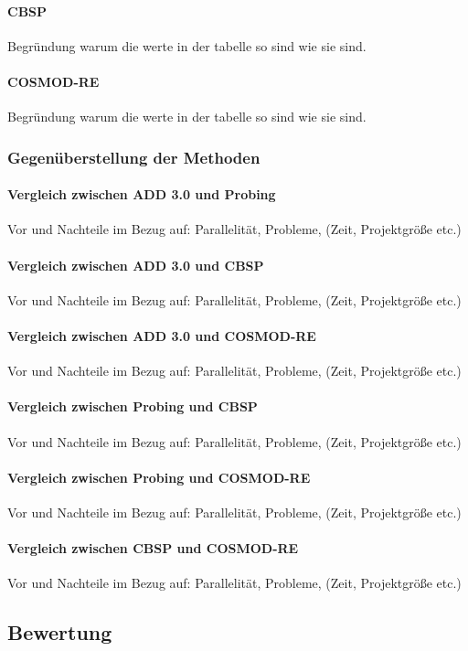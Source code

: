 \paragraph{CBSP}
Begründung warum die werte in der tabelle so sind wie sie sind. \\

\paragraph{COSMOD-RE}
Begründung warum die werte in der tabelle so sind wie sie sind. \\

\subsubsection{Gegenüberstellung der Methoden}


\paragraph{Vergleich zwischen ADD 3.0 und Probing}
Vor und Nachteile im Bezug auf: Parallelität, Probleme, (Zeit, Projektgröße etc.)\\

\paragraph{Vergleich zwischen ADD 3.0 und  CBSP}
Vor und Nachteile im Bezug auf: Parallelität, Probleme, (Zeit, Projektgröße etc.)\\

\paragraph{Vergleich zwischen ADD 3.0 und  COSMOD-RE}
Vor und Nachteile im Bezug auf: Parallelität, Probleme, (Zeit, Projektgröße etc.)\\

\paragraph{Vergleich zwischen Probing und  CBSP}
Vor und Nachteile im Bezug auf: Parallelität, Probleme, (Zeit, Projektgröße etc.)\\

\paragraph{Vergleich zwischen Probing und  COSMOD-RE}
Vor und Nachteile im Bezug auf: Parallelität, Probleme, (Zeit, Projektgröße etc.)\\

\paragraph{Vergleich zwischen CBSP und  COSMOD-RE}
Vor und Nachteile im Bezug auf: Parallelität, Probleme, (Zeit, Projektgröße etc.)\\


\subsection{Bewertung}
